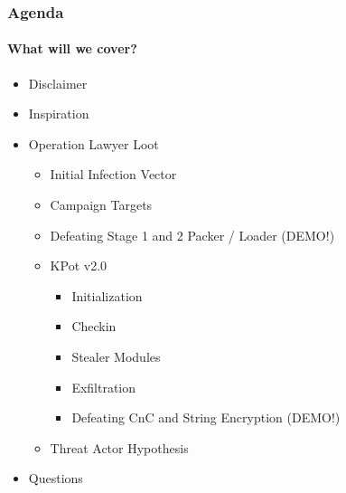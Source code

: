 \documentclass[aspectratio=169]{beamer}
\begin{document}
{
\begin{frame}
  \frametitle{Agenda}
  \framesubtitle{What will we cover?}
  \begin{itemize}
  \item{Disclaimer}
  \item{Inspiration}
  \item{Operation Lawyer Loot}
    \begin{itemize}
      \item{Initial Infection Vector}
      \item{Campaign Targets}
      \item{Defeating Stage 1 and 2 Packer / Loader (DEMO!)}
      \item{KPot v2.0}
        \begin{itemize}
        \item{Initialization}
        \item{Checkin}
        \item{Stealer Modules}
        \item{Exfiltration}
        \item{Defeating CnC and String Encryption (DEMO!)}
        \end{itemize}
      \item{Threat Actor Hypothesis}
    \end{itemize}
  \item{Questions}
  \end{itemize}
\end{frame}
}
\end{document}
